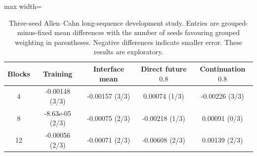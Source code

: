 \begin{table}[htbp]
\centering\scriptsize
\caption{Three-seed Allen--Cahn long-sequence development study. Entries are grouped-minus-fixed mean differences with the number of seeds favouring grouped weighting in parentheses. Negative differences indicate smaller error. These results are exploratory.}
\label{tab:ac-long-sequence}
\begin{adjustbox}{max width=\linewidth}
\begin{tabular}{ccccc}
\toprule
Blocks & Training & Interface mean & Direct future $0.8$ & Continuation $0.8$\\
\midrule
4 & -0.00148 (3/3) & -0.00157 (3/3) & 0.00074 (1/3) & -0.00226 (3/3)\\
8 & -8.63e-05 (2/3) & -0.00075 (2/3) & -0.00218 (1/3) & 0.00091 (0/3)\\
12 & -0.00056 (2/3) & -0.00071 (2/3) & -0.00608 (2/3) & 0.00139 (2/3)\\
\bottomrule
\end{tabular}
\end{adjustbox}
\end{table}
